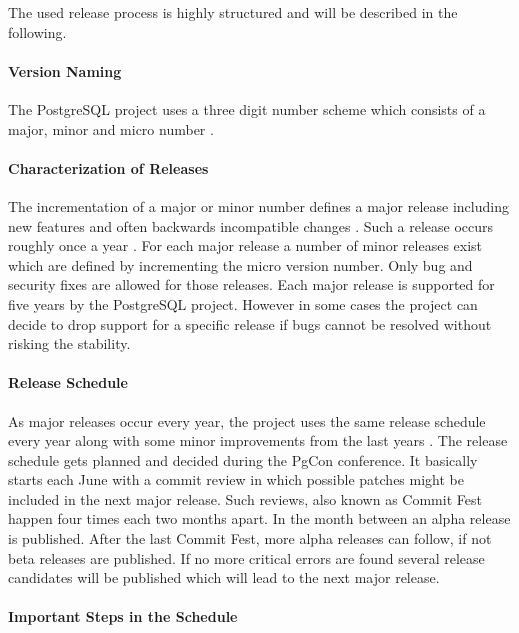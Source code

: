 The used release process is highly structured and will be described in the
following.

\paragraph{Version Naming}

The PostgreSQL project uses a three digit number scheme which consists of a
major, minor and micro number \cite{PostgreSQLVersioning}.

\paragraph{Characterization of Releases}

The incrementation of a major or minor number defines a major release including
new features and often backwards incompatible changes
\cite{PostgreSQLVersioning}. Such a release occurs roughly once a year
\cite{PostgreSQLDevelopment,PostgreSQLFAQ}. For each major release a number of
minor releases exist which are defined by incrementing the micro version
number. Only bug and security fixes are allowed for those releases. Each major
release is supported for five years by the PostgreSQL project. However in some
cases the project can decide to drop support for a specific release if bugs
cannot be resolved without risking the stability.

\paragraph{Release Schedule}

As major releases occur every year, the project uses the same release schedule
every year along with some minor improvements from the last years
\cite{PostgreSQLDevelopment}. The release schedule gets planned and decided
during the PgCon conference. It basically starts each June with a commit review
in which possible patches might be included in the next major release. Such
reviews, also known as Commit Fest happen four times each two months apart. In
the month between an alpha release is published. After the last Commit Fest,
more alpha releases can follow, if not beta releases are published. If no more
critical errors are found several release candidates will be published which
will lead to the next major release.

\paragraph{Important Steps in the Schedule}

